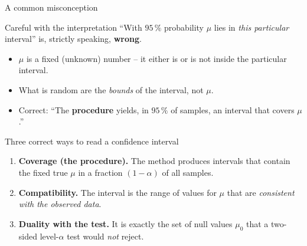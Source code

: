 \documentclass[aspectratio=169,11pt]{beamer}
\begin{document}
\begin{frame}{A common misconception}
  \begin{alertblock}{Careful with the interpretation}
    ``With $95\,\%$ probability $\mu$ lies in \emph{this particular}
    interval'' is, strictly speaking, \textbf{wrong}.
  \end{alertblock}
  \begin{itemize}
    \item $\mu$ is a fixed (unknown) number -- it either is or is not inside
          the particular interval.
    \item What is random are the \emph{bounds} of the interval, not $\mu$.
    \item Correct: ``The \textbf{procedure} yields, in $95\,\%$ of samples, an
          interval that covers $\mu$.''
  \end{itemize}
\end{frame}

\begin{frame}{Three correct ways to read a confidence interval}
  \begin{enumerate}\setlength{\itemsep}{5pt}
    \item \textbf{Coverage (the procedure).} The method produces intervals that
          contain the fixed true $\mu$ in a fraction $(1-\alpha)$ of all
          samples.
    \item \textbf{Compatibility.} The interval is the range of values for $\mu$
          that are \emph{consistent with the observed data}.
    \item \textbf{Duality with the test.} It is exactly the set of null values
          $\mu_0$ that a two-sided level-$\alpha$ test would \emph{not} reject.
  \end{enumerate}
\end{frame}
\end{document}
